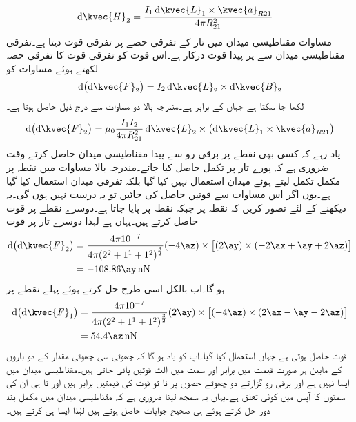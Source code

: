 \begin{align*}
\dif \kvec{H}_2&=\frac{I_1 \dif \kvec{L}_1 \times \kvec{a}_{R21}}{4 \pi R_{21}^2}
\end{align*}
مساوات  مقناطیسی میدان  میں تار کے تفرقی حصے پر تفرقی قوت دیتا ہے۔تفرقی مقناطیسی میدان  سے  پر  پیدا قوت درکار ہے۔اس قوت کو تفرقی قوت کا تفرقی حصہ  لکھتے ہوئے مساوات  کو 
\begin{align*}
\dif \left(\dif \kvec{F}_2 \right)=I_2 \dif \kvec{L}_2 \times \dif \kvec{B}_2
\end{align*}
لکھا جا سکتا ہے جہاں  کے برابر ہے۔مندرجہ بالا دو مساوات سے درج ذیل حاصل ہوتا ہے۔
\begin{align}\label{مساوات_امالہ_تفرقی_تفرقی_قوت}
\dif \left(\dif \kvec{F}_2 \right)=\mu_0 \frac{I_1 I_2}{4\pi R_{21}^2} \dif \kvec{L}_2 \times \left(\dif \kvec{L}_1 \times \kvec{a}_{R21} \right)
\end{align}
یاد رہے کہ کسی بھی نقطے پر برقی رو سے پیدا مقناطیسی میدان حاصل کرتے وقت ضروری ہے کہ پورے تار پر تکمل حاصل کیا جائے۔مندرجہ بالا مساوات میں نقطہ  پر مکمل تکمل لیتے ہوئے میدان  استعمال نہیں کیا گیا بلکہ تفرقی میدان  استعمال کیا گیا ہے۔یوں اگر اس مساوات سے قوتیں حاصل کی جائیں تو یہ درست نہیں ہوں گی۔یہ دیکھنے کے لئے تصور کریں کہ نقطہ  پر  جبکہ نقطہ  پر  پایا جاتا ہے۔دوسرے نقطے پر قوت حاصل کرتے ہیں۔یہاں  ہے لہٰذا دوسرے تار پر قوت
\begin{align*}
\dif \left(\dif \kvec{F}_2 \right)&= \frac{4 \pi 10^{-7}}{4\pi {\left(2^2+1^1+1^2\right)}^\frac{3}{2}} (-4\az) \times \left[(2\ay) \times \left( -2\ax+\ay+2\az \right) \right]\\
&=-108.86 \ay \, \si{\nano \newton}
\end{align*}
ہو گا۔اب بالکل اسی طرح حل کرتے ہوئے پہلے نقطے پر
\begin{align*}
\dif \left(\dif \kvec{F}_1 \right)&= \frac{4 \pi 10^{-7}}{4\pi {\left(2^2+1^1+1^2\right)}^\frac{3}{2}} (2\ay)  \times \left[(-4\az)\times \left( 2\ax-\ay-2\az \right) \right]\\
&=54.4 \az \, \si{\nano \newton}
\end{align*}
 قوت حاصل ہوتی ہے جہاں  استعمال کیا گیا۔آپ کو یاد ہو گا کہ  چھوٹی سی چھوٹی مقدار کے دو باروں کے مابین ہر صورت قیمت میں برابر اور سمت میں الٹ قوتیں پائی جاتی ہیں۔مقناطیسی میدان میں ایسا نہیں ہے اور برقی رو گزارتے دو چھوٹے حصوں پر نا تو قوت کی قیمتیں برابر ہیں اور نا ہی ان کی سمتوں کا آپس میں کوئی تعلق ہے۔یہاں یہ سمجھ لینا ضروری ہے کہ مقناطیسی میدان میں مکمل بند دور حل کرتے ہوئے ہی صحیح جوابات حاصل ہوتے ہیں لہٰذا ایسا ہی کرتے ہیں۔

